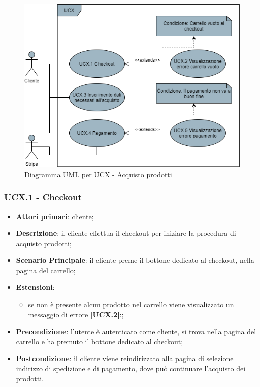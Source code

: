 \begin{figure}[H]
\centering
\includegraphics[scale=0.6]{res/UseCase/Immagini/AcquistoProdotti}
\caption{Diagramma UML per UCX - Acquisto prodotti}
\end{figure}

\subsubsection{UCX.1 - Checkout}
\begin{itemize}
\item \textbf{Attori primari}: cliente;
\item \textbf{Descrizione}: il cliente effettua il checkout per iniziare la procedura di acquisto prodotti;
\item \textbf{Scenario Principale}: il cliente preme il bottone dedicato al checkout, nella pagina del carrello;
\item \textbf{Estensioni}:
\begin{itemize}
\item se non è presente alcun prodotto nel carrello viene visualizzato un messaggio di errore \textbf{[UCX.2]}:;
\end{itemize}
\item \textbf{Precondizione}: l'utente è autenticato come cliente, si trova nella pagina del carrello e ha premuto il bottone dedicato al checkout;
\item \textbf{Postcondizione}: il cliente viene reindirizzato alla pagina di selezione indirizzo di spedizione e di pagamento, dove può continuare l'acquisto dei prodotti.
\end{itemize}

